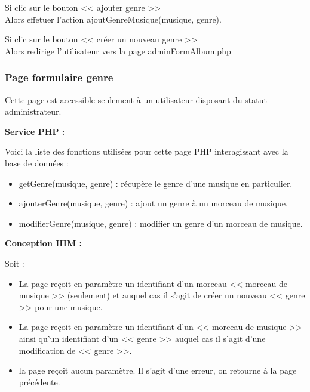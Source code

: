 \begin{paragraphe}
			\begin{paragraphe}
				Si clic sur le bouton << ajouter genre >> \\
				Alors effetuer l'action ajoutGenreMusique(musique, genre).
			\end{paragraphe}

			\begin{paragraphe}
				Si clic sur le bouton << créer un nouveau genre >> \\
				Alors redirige l'utilisateur vers la page adminFormAlbum.php
			\end{paragraphe}

	\clearpage

		\subsubsection{Page formulaire genre}

			\begin{paragraphe}
				Cette page est accessible seulement à un utilisateur disposant du statut administrateur.
			\end{paragraphe}

			\begin{paragraphe}
				\textbf{Service PHP :}
			\end{paragraphe}

			\begin{paragraphe}
				Voici la liste des fonctions utilisées pour cette page PHP interagissant avec la base de données :
				\begin{itemize}
					\item getGenre(musique, genre) : récupère le genre d'une musique en particulier.
					\item ajouterGenre(musique, genre) : ajout un genre à un morceau de musique.
					\item modifierGenre(musique, genre) : modifier un genre d'un morceau de musique.
				\end{itemize}
			\end{paragraphe}

			\begin{paragraphe}
				\textbf{Conception IHM :}
			\end{paragraphe}

			\begin{paragraphe}
				Soit :
				\begin{itemize}
					\item La page reçoit en paramètre un identifiant d'un morceau << morceau de musique >> (seulement) et auquel cas il s'agit de créer un nouveau << genre >> pour une musique.
					\item La page reçoit en paramètre un identifiant d'un << morceau de musique >> ainsi qu'un identifiant d'un << genre >> auquel cas il s'agit d'une modification de << genre >>.
					\item la page reçoit aucun paramètre. Il s'agit d'une erreur, on retourne à la page précédente.
				\end{itemize}
			\end{paragraphe}


\end{paragraphe}
